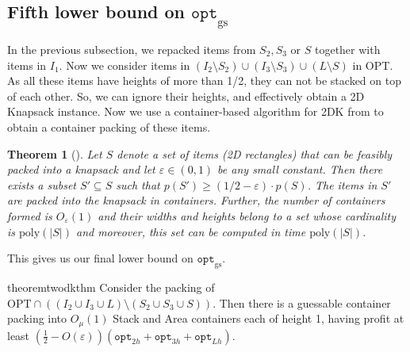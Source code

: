 \documentclass[10pt,a4paper]{amsart}
\newcommand{\eps}{\varepsilon}
\renewcommand{\epsilon}{\varepsilon} %
\newcommand{\container}{container\xspace}
\newtheorem{theorem}{Theorem}[section]
\newtheorem{corollary}[theorem]{Corollary}
\theoremstyle{definition}
\newcommand{\alg}{\mathtt{opt}_{\mathrm{gs}}}
\newcommand{\optgs}{\mathtt{opt}_{\mathrm{gs}}}
\newcommand{\opttwoh}{\mathtt{opt}_{2h}}
\newcommand{\optthreeh}{\mathtt{opt}_{3h}}
\newcommand{\optlh}{\mathtt{opt}_{Lh}}
\begin{document}
\subsection{Fifth lower bound on \texorpdfstring{$\optgs$}{optgs}}
\label{sec:fifthlb}
In the previous subsection, we repacked items from $S_2, S_3$ or $S$ together with items in $I_1$. 
Now we consider items in $(I_2\setminus S_2)\cup (I_3\setminus S_3)\cup (L\setminus S)$ in OPT. As all these items have heights of more than 1/2, they can not be stacked on top of each other. So, we can ignore their heights, and effectively obtain a 2D Knapsack instance. 
Now we use a container-based algorithm for 2DK from \cite{khan2021approximation} to obtain a container packing of these items. 

\begin{theorem} [\cite{khan2021approximation}]
\label{thm:cont2dk}
Let $S$ denote a set of items (2D rectangles) that can be feasibly packed into a knapsack and let $\eps \in (0,1)$ be any small constant.
Then there exists a subset $S' \subseteq S$ such that $p(S') \ge (1/2-\eps) \cdot p(S)$. The items in $S'$ are packed into the knapsack in containers. Further, the number of containers formed is $O_{\eps}(1)$ and their widths and heights belong to a set whose cardinality is $\text{poly}(|S|)$ and
moreover, this set can be computed in time $\text{poly}(|S|)$.
\end{theorem}

This gives us our final lower bound on $\alg$.


\begin{restatable}{theorem}{twodkthm}%
\label{thm:2dknapsack}
    Consider the packing of $\text{OPT}\cap ((I_2\cup I_3\cup L)\setminus (S_2\cup S_3\cup S))$. Then there is a guessable \container packing into $O_{\mu}(1)$ Stack and Area containers each of height 1, having profit at least $\left(\frac{1}{2}-O(\epsilon)\right)(\opttwoh+\optthreeh+\optlh)$.
\end{restatable}



\end{document}
